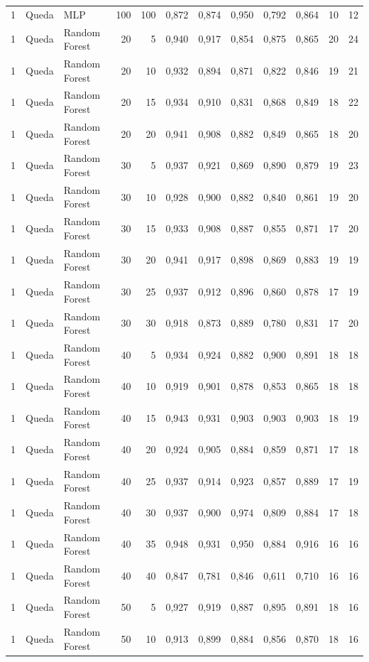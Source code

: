 \begin{longtable}{@{}rllrrrrrrrrr@{}}
1 & Queda & MLP & 100 & 100 & 0,872 & 0,874 & 0,950 & 0,792 & 0,864 & 10 & 12 \\
1 & Queda & Random Forest & 20 & 5 & 0,940 & 0,917 & 0,854 & 0,875 & 0,865 & 20 & 24 \\
1 & Queda & Random Forest & 20 & 10 & 0,932 & 0,894 & 0,871 & 0,822 & 0,846 & 19 & 21 \\
1 & Queda & Random Forest & 20 & 15 & 0,934 & 0,910 & 0,831 & 0,868 & 0,849 & 18 & 22 \\
1 & Queda & Random Forest & 20 & 20 & 0,941 & 0,908 & 0,882 & 0,849 & 0,865 & 18 & 20 \\
1 & Queda & Random Forest & 30 & 5 & 0,937 & 0,921 & 0,869 & 0,890 & 0,879 & 19 & 23 \\
1 & Queda & Random Forest & 30 & 10 & 0,928 & 0,900 & 0,882 & 0,840 & 0,861 & 19 & 20 \\
1 & Queda & Random Forest & 30 & 15 & 0,933 & 0,908 & 0,887 & 0,855 & 0,871 & 17 & 20 \\
1 & Queda & Random Forest & 30 & 20 & 0,941 & 0,917 & 0,898 & 0,869 & 0,883 & 19 & 19 \\
1 & Queda & Random Forest & 30 & 25 & 0,937 & 0,912 & 0,896 & 0,860 & 0,878 & 17 & 19 \\
1 & Queda & Random Forest & 30 & 30 & 0,918 & 0,873 & 0,889 & 0,780 & 0,831 & 17 & 20 \\
1 & Queda & Random Forest & 40 & 5 & 0,934 & 0,924 & 0,882 & 0,900 & 0,891 & 18 & 18 \\
1 & Queda & Random Forest & 40 & 10 & 0,919 & 0,901 & 0,878 & 0,853 & 0,865 & 18 & 18 \\
1 & Queda & Random Forest & 40 & 15 & 0,943 & 0,931 & 0,903 & 0,903 & 0,903 & 18 & 19 \\
1 & Queda & Random Forest & 40 & 20 & 0,924 & 0,905 & 0,884 & 0,859 & 0,871 & 17 & 18 \\
1 & Queda & Random Forest & 40 & 25 & 0,937 & 0,914 & 0,923 & 0,857 & 0,889 & 17 & 19 \\
1 & Queda & Random Forest & 40 & 30 & 0,937 & 0,900 & 0,974 & 0,809 & 0,884 & 17 & 18 \\
1 & Queda & Random Forest & 40 & 35 & 0,948 & 0,931 & 0,950 & 0,884 & 0,916 & 16 & 16 \\
1 & Queda & Random Forest & 40 & 40 & 0,847 & 0,781 & 0,846 & 0,611 & 0,710 & 16 & 16 \\
1 & Queda & Random Forest & 50 & 5 & 0,927 & 0,919 & 0,887 & 0,895 & 0,891 & 18 & 16 \\
1 & Queda & Random Forest & 50 & 10 & 0,913 & 0,899 & 0,884 & 0,856 & 0,870 & 18 & 16 \\

\end{longtable}
